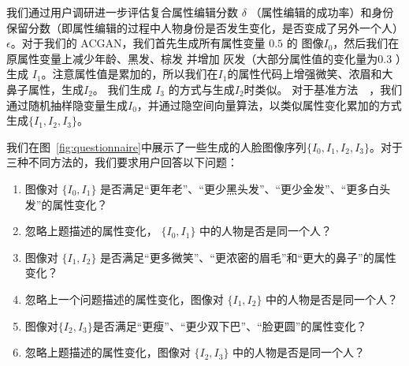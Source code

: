 我们通过用户调研进一步评估复合属性编辑分数 $\delta$ （属性编辑的成功率）和身份保留分数（即属性编辑的过程中人物身份是否发生变化，是否变成了另外一个人） $\epsilon$。对于我们的 ACGAN，我们首先生成所有属性变量 $0.5$ 的 图像$I_0$，然后我们在原属性变量上减少年龄、黑发、棕发 并增加 灰发（大部分属性值的变化量为$0.3$ ）生成 $I_1$。注意属性值是累加的，所以我们在$I_1$的属性代码上增强微笑、浓眉和大鼻子属性，生成$I_2$。 我们生成 $I_3$ 的方式与生成$I_2$时类似。 对于基准方法~\cite{interfacegan}~\cite{iclr2021}，我们通过随机抽样隐变量生成$I_0$，并通过隐空间向量算法，以类似属性变化累加的方式生成$\{I_1, I_2, I_3\}$。

我们在图~\ref{fig:questionnaire}中展示了一些生成的人脸图像序列$\{I_0, I_1, I_2, I_3\}$。对于三种不同方法的，我们要求用户回答以下问题：

\begin{enumerate}
\item 图像对 $\{I_0, I_1\}$ 是否满足“更年老”、“更少黑头发”、“更少金发”、“更多白头发”的属性变化？

\item 忽略上题描述的属性变化， $\{I_0, I_1\}$ 中的人物是否是同一个人？

\item 图像对 $\{I_1, I_2\}$ 是否满足“更多微笑”、“更浓密的眉毛”和“更大的鼻子”的属性变化？

\item 忽略上一个问题描述的属性变化，图像对 $\{I_1, I_2\}$ 中的人物是否是同一个人？

\item 图像对$\{I_2, I_3\}$是否满足“更瘦”、“更少双下巴”、“脸更圆”的属性变化？

\item 忽略上题描述的属性变化，图像对 $\{I_2, I_3\}$ 中的人物是否是同一个人？
\end{enumerate}


